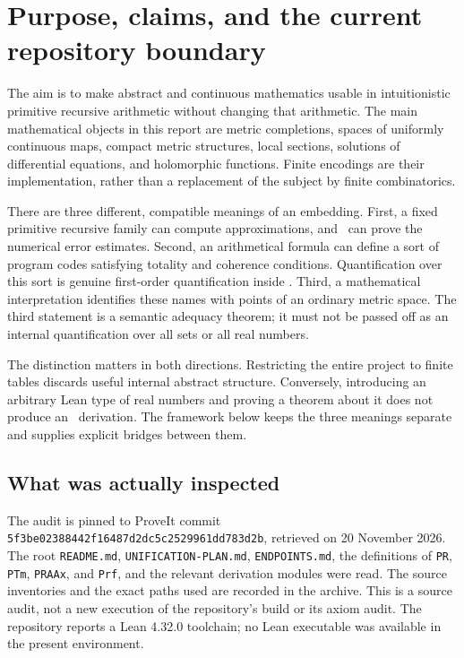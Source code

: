 \section{Purpose, claims, and the current repository boundary}\label{sec:scope}

The aim is to make abstract and continuous mathematics usable in intuitionistic
primitive recursive arithmetic without changing that arithmetic. The main
mathematical objects in this report are metric completions, spaces of uniformly
continuous maps, compact metric structures, local sections, solutions of
differential equations, and holomorphic functions. Finite encodings are their
implementation, rather than a replacement of the subject by finite combinatorics.

There are three different, compatible meanings of an embedding. First, a fixed
primitive recursive family can compute approximations, and \ipra\ can prove the
numerical error estimates. Second, an arithmetical formula can define a sort of
program codes satisfying totality and coherence conditions. Quantification over
this sort is genuine first-order quantification inside \ipra. Third, a mathematical
interpretation identifies these names with points of an ordinary metric space.
The third statement is a semantic adequacy theorem; it must not be passed off as
an internal quantification over all sets or all real numbers.

The distinction matters in both directions. Restricting the entire project to
finite tables discards useful internal abstract structure. Conversely, introducing
an arbitrary Lean type of real numbers and proving a theorem about it does not
produce an \ipra\ derivation. The framework below keeps the three meanings
separate and supplies explicit bridges between them.

\subsection{What was actually inspected}

The audit is pinned to ProveIt commit
\texttt{5f3be02388442f16487d2dc5c2529961dd783d2b}, retrieved on 20 November 2026.
The root \texttt{README.md}, \texttt{UNIFICATION-PLAN.md}, \texttt{ENDPOINTS.md},
the definitions of \texttt{PR}, \texttt{PTm}, \texttt{PRAAx}, and \texttt{Prf},
and the relevant derivation modules were read. The source inventories and the
exact paths used are recorded in the archive. This is a source audit, not a new
execution of the repository's build or its axiom audit. The repository reports a
Lean 4.32.0 toolchain; no Lean executable was available in the present environment.

